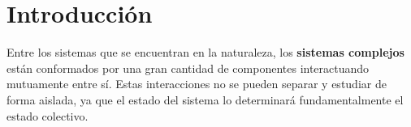 \chapter{Introducción}



Entre los sistemas que se encuentran en la naturaleza, los \textbf{sistemas complejos} están conformados por una gran cantidad de componentes interactuando mutuamente entre sí. Estas interacciones no se pueden separar y estudiar de forma aislada, ya que el estado del sistema lo determinará fundamentalmente el estado colectivo. 






